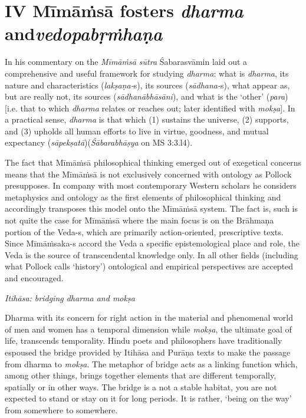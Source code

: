 \section*{IV Mīmāṁsā fosters \textit{dharma} and\hfill \break \textit{vedopabṛṁhaṇa}}

In his commentary on the \textit{Mīmāṁsā sūtra} Śabarasvāmin laid out a comprehensive and useful framework for studying \textit{dharma}: what is \textit{dharma}, its nature and characteristics (\textit{lakṣaṇa-}s), its sources (\textit{sādhana-}s), what appear as, but are really not, its sources (\textit{sādhanābhāsāni}), and what is the ‘other’ (\textit{para}) [i.e. that to which \textit{dharma} relates or reaches out; later identified with \textit{mokṣa}]. In a practical sense, \textit{dharma} is that which (1) sustains the universe, (2) supports, and (3) upholds all human efforts to live in virtue, goodness, and mutual expectancy (\textit{sāpekṣatā})(\textit{Śābarabhāṣya} on MS 3:3.l4).

The fact that Mīmāṁsā philosophical thinking emerged out of exegetical concerns means that the Mīmāṁsā is not exclusively concerned with ontology as Pollock presupposes. In company with most contemporary Western scholars he considers metaphysics and ontology as the first elements of philosophical thinking and accordingly transposes this model onto the Mīmāṁsā system. The fact is, such is not quite the case for Mīmāṁsā where the main focus is on the Brāhmaṇa portion of the Veda-s, which are primarily action-oriented, prescriptive texts. Since Mīmāṁsaka-s accord the Veda a specific epistemological place and role, the Veda is the source of transcendental knowledge only. In all other fields (including what Pollock calls ‘history’) ontological and empirical perspectives are accepted and encouraged. 

\textit{Itihāsa: bridging dharma and mokṣa}

Dharma with its concern for right action in the material and phenomenal world of men and women has a temporal dimension while \textit{mokṣa}, the ultimate goal of life, transcends temporality. Hindu poets and philosophers have traditionally espoused the bridge provided by Itihāsa and Purāṇa texts to make the passage from dharma to \textit{mokṣa}. The metaphor of bridge acts as a linking function which, among other things, brings together elements that are different temporally, spatially or in other ways. The bridge is a not a stable habitat, you are not expected to stand or stay on it for long periods. It is rather, ‘being on the way’ from somewhere to somewhere.

